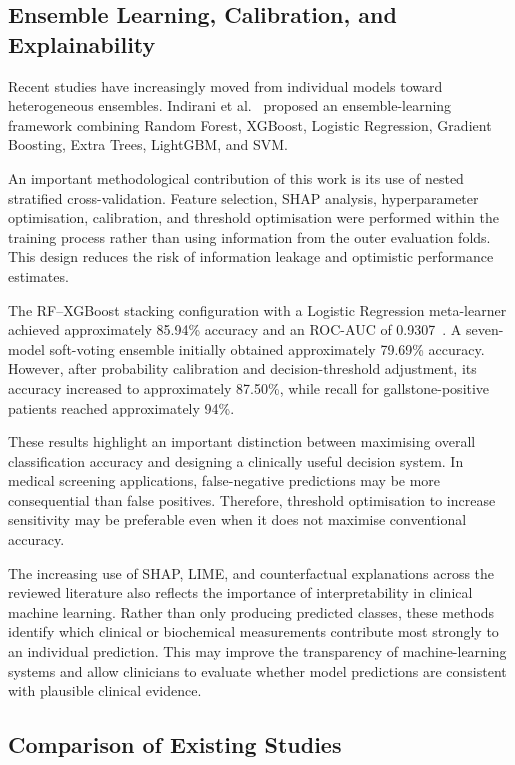 \subsection{Ensemble Learning, Calibration, and Explainability}

Recent studies have increasingly moved from individual models toward heterogeneous ensembles. Indirani et al.~\cite{indirani2026ensemble} proposed an ensemble-learning framework combining Random Forest, XGBoost, Logistic Regression, Gradient Boosting, Extra Trees, LightGBM, and SVM.

An important methodological contribution of this work is its use of nested stratified cross-validation. Feature selection, SHAP analysis, hyperparameter optimisation, calibration, and threshold optimisation were performed within the training process rather than using information from the outer evaluation folds. This design reduces the risk of information leakage and optimistic performance estimates.

The RF--XGBoost stacking configuration with a Logistic Regression meta-learner achieved approximately 85.94\% accuracy and an ROC-AUC of 0.9307~\cite{indirani2026ensemble}. A seven-model soft-voting ensemble initially obtained approximately 79.69\% accuracy. However, after probability calibration and decision-threshold adjustment, its accuracy increased to approximately 87.50\%, while recall for gallstone-positive patients reached approximately 94\%.

These results highlight an important distinction between maximising overall classification accuracy and designing a clinically useful decision system. In medical screening applications, false-negative predictions may be more consequential than false positives. Therefore, threshold optimisation to increase sensitivity may be preferable even when it does not maximise conventional accuracy.

The increasing use of SHAP, LIME, and counterfactual explanations across the reviewed literature also reflects the importance of interpretability in clinical machine learning. Rather than only producing predicted classes, these methods identify which clinical or biochemical measurements contribute most strongly to an individual prediction. This may improve the transparency of machine-learning systems and allow clinicians to evaluate whether model predictions are consistent with plausible clinical evidence.

\subsection{Comparison of Existing Studies}

